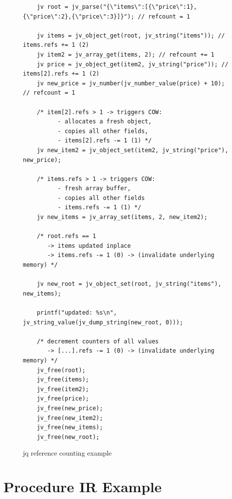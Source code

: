 \begin{figure}[H]
\begin{lstlisting}
    jv root = jv_parse("{\"items\":[{\"price\":1},{\"price\":2},{\"price\":3}]}"); // refcount = 1

    jv items = jv_object_get(root, jv_string("items")); // items.refs += 1 (2)
    jv item2 = jv_array_get(items, 2); // refcount += 1
    jv price = jv_object_get(item2, jv_string("price")); // items[2].refs += 1 (2)
    jv new_price = jv_number(jv_number_value(price) + 10); // refcount = 1

    /* item[2].refs > 1 -> triggers COW:
          - allocates a fresh object,
          - copies all other fields,
          - items[2].refs -= 1 (1) */
    jv new_item2 = jv_object_set(item2, jv_string("price"), new_price);

    /* items.refs > 1 -> triggers COW:
          - fresh array buffer,
          - copies all other fields
          - items.refs -= 1 (1) */
    jv new_items = jv_array_set(items, 2, new_item2);

    /* root.refs == 1
       -> items updated inplace
       -> items.refs -= 1 (0) -> (invalidate underlying memory) */

    jv new_root = jv_object_set(root, jv_string("items"), new_items);

    printf("updated: %s\n", jv_string_value(jv_dump_string(new_root, 0)));

    /* decrement counters of all values
       -> [...].refs -= 1 (0) -> (invalidate underlying memory) */
    jv_free(root);
    jv_free(items);
    jv_free(item2);
    jv_free(price);
    jv_free(new_price);
    jv_free(new_item2);
    jv_free(new_items);
    jv_free(new_root);
\end{lstlisting}
\caption{jq reference counting example}
\label{fig:jv-c-refcount}
\end{figure}
\FloatBarrier

\section{Procedure \ac{IR} Example}
\label{sec:proc-ir}

\FloatBarrier

